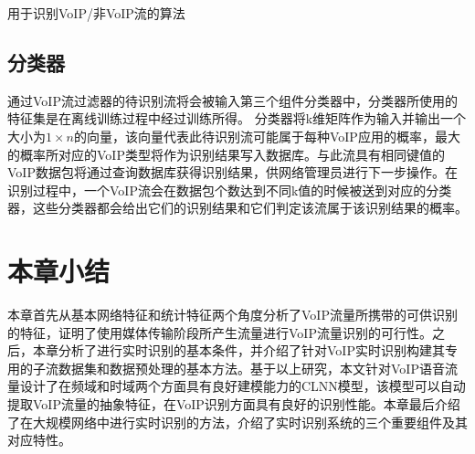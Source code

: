 

\begin{algorithm}[h]
\caption{用于识别VoIP/非VoIP流的算法}
\label{algorithm:filter}
\end{algorithm}

\subsection{分类器}
通过VoIP流过滤器的待识别流将会被输入第三个组件分类器中，分类器所使用的特征集是在离线训练过程中经过训练所得。
分类器将k维矩阵作为输入并输出一个大小为$1 \times n$的向量，该向量代表此待识别流可能属于每种VoIP应用的概率，最大的概率所对应的VoIP类型将作为识别结果写入数据库。与此流具有相同键值的VoIP数据包将通过查询数据库获得识别结果，供网络管理员进行下一步操作。在识别过程中，一个VoIP流会在数据包个数达到不同k值的时候被送到对应的分类器，这些分类器都会给出它们的识别结果和它们判定该流属于该识别结果的概率。

\section{本章小结}
本章首先从基本网络特征和统计特征两个角度分析了VoIP流量所携带的可供识别的特征，证明了使用媒体传输阶段所产生流量进行VoIP流量识别的可行性。之后，本章分析了进行实时识别的基本条件，并介绍了针对VoIP实时识别构建其专用的子流数据集和数据预处理的基本方法。基于以上研究，本文针对VoIP语音流量设计了在频域和时域两个方面具有良好建模能力的CLNN模型，该模型可以自动提取VoIP流量的抽象特征，在VoIP识别方面具有良好的识别性能。本章最后介绍了在大规模网络中进行实时识别的方法，介绍了实时识别系统的三个重要组件及其对应特性。















